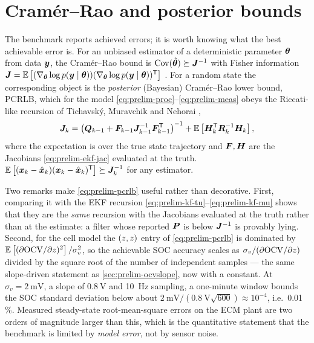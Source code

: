 \section{Cram\'er--Rao and posterior bounds}
\label{sec:prelim-crlb}

The benchmark reports achieved errors; it is worth knowing what the best achievable error is.
For an unbiased estimator of a deterministic parameter $\bm{\theta}$ from data $\bm{y}$, the
Cram\'er--Rao bound is $\operatorname{Cov}(\hat{\bm{\theta}})\succeq \bm{J}^{-1}$ with Fisher
information $\bm{J} = \mathbb{E}\left[(\nabla_{\bm{\theta}}\log p(\bm{y}\mid\bm{\theta}))(\nabla_{\bm{\theta}}\log
p(\bm{y}\mid\bm{\theta}))^{\mathsf{T}}\right]$ \cite{vantrees1968}. For a random state the corresponding object is the
\emph{posterior} (Bayesian) Cram\'er--Rao lower bound, PCRLB, which for the model
\eqref{eq:prelim-proc}--\eqref{eq:prelim-meas} obeys the Riccati-like recursion of Tichavsk\'y,
Muravchik and Nehorai \cite{tichavsky1998pcrb},
\begin{equation}
\bm{J}_{k} = \left(\bm{Q}_{k-1} + \bm{F}_{k-1}\bm{J}_{k-1}^{-1}\bm{F}_{k-1}^{\mathsf{T}}\right)^{-1}
  + \mathbb{E}\left[\bm{H}_k^{\mathsf{T}}\bm{R}_k^{-1}\bm{H}_k\right],
\label{eq:prelim-pcrlb}
\end{equation}
where the expectation is over the true state trajectory and $\bm{F},\bm{H}$ are the Jacobians
\eqref{eq:prelim-ekf-jac} evaluated at the truth. $\mathbb{E}\left[(\bm{x}_k-\hat{\bm{x}}_k)(\bm{x}_k-\hat{\bm{x}}_k)^{\mathsf{T}}\right]\succeq
\bm{J}_k^{-1}$ for any estimator.

Two remarks make \eqref{eq:prelim-pcrlb} useful rather than decorative. First, comparing it with
the EKF recursion \eqref{eq:prelim-kf-tu}--\eqref{eq:prelim-kf-mu} shows that they are the
\emph{same} recursion with the Jacobians evaluated at the truth rather than at the estimate: a
filter whose reported $\bm{P}$ is below $\bm{J}^{-1}$ is provably lying. Second, for the cell model
the $(z,z)$ entry of \eqref{eq:prelim-pcrlb} is dominated by
$\mathbb{E}\left[(\partial\mathrm{OCV}/\partial z)^2\right]/\sigma_v^2$, so the achievable SOC accuracy scales as
$\sigma_v/(\partial\mathrm{OCV}/\partial z)$ divided by the square root of the number of independent
samples --- the same slope-driven statement as \cref{sec:prelim-ocvslope}, now with a constant.
At $\sigma_v=\SI{2}{\milli\volt}$, a slope of $\SI{0.8}{\volt}$ and \SI{10}{\hertz} sampling, a
one-minute window bounds the SOC standard deviation below about
$\SI{2}{\milli\volt}/(\SI{0.8}{\volt}\sqrt{600}) \approx 10^{-4}$, i.e.\ \num{0.01}\,\%. Measured
steady-state root-mean-square errors on the ECM plant are two orders of magnitude larger than
this, which is the quantitative statement that the benchmark is limited by \emph{model error},
not by sensor noise.

